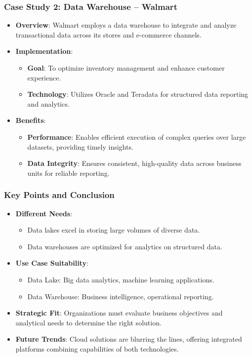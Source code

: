 \documentclass[aspectratio=169]{beamer}
\begin{document}
\begin{frame}[fragile]
    \frametitle{Case Study 2: Data Warehouse – Walmart}
    \begin{itemize}
        \item \textbf{Overview}: Walmart employs a data warehouse to integrate and analyze transactional data across its stores and e-commerce channels.
        \item \textbf{Implementation}:
        \begin{itemize}
            \item \textbf{Goal}: To optimize inventory management and enhance customer experience.
            \item \textbf{Technology}: Utilizes Oracle and Teradata for structured data reporting and analytics.
        \end{itemize}
        \item \textbf{Benefits}:
        \begin{itemize}
            \item \textbf{Performance}: Enables efficient execution of complex queries over large datasets, providing timely insights.
            \item \textbf{Data Integrity}: Ensures consistent, high-quality data across business units for reliable reporting.
        \end{itemize}
    \end{itemize}
\end{frame}

\begin{frame}[fragile]
    \frametitle{Key Points and Conclusion}
    \begin{itemize}
        \item \textbf{Different Needs}: 
        \begin{itemize}
            \item Data lakes excel in storing large volumes of diverse data.
            \item Data warehouses are optimized for analytics on structured data.
        \end{itemize}
        \item \textbf{Use Case Suitability}:
        \begin{itemize}
            \item Data Lake: Big data analytics, machine learning applications.
            \item Data Warehouse: Business intelligence, operational reporting.
        \end{itemize}
        \item \textbf{Strategic Fit}: Organizations must evaluate business objectives and analytical needs to determine the right solution.
        \item \textbf{Future Trends}: Cloud solutions are blurring the lines, offering integrated platforms combining capabilities of both technologies.
    \end{itemize}
\end{frame}
\end{document}

